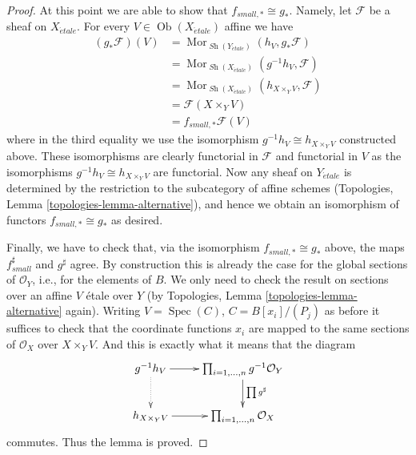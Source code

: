 \documentclass[10pt,a4paper]{amsart}
\theoremstyle{plain}
\theoremstyle{definition}
\theoremstyle{remark}
\numberwithin{equation}{subsection}
\def\Spec{\mathop{\mathrm{Spec}}}
\def\Mor{\mathop{\mathrm{Mor}}\nolimits}
\def\Ob{\mathop{\mathrm{Ob}}\nolimits}
\def\Sh{\mathop{\mathit{Sh}}\nolimits}
\def\etale{{\acute{e}tale}}
\begin{document}
\begin{proof}
\medskip\noindent
At this point we are able to show that $f_{small, *} \cong g_*$.
Namely, let $\mathcal{F}$ be a sheaf on $X_\etale$. For every
$V \in \Ob(X_\etale)$ affine we have
\begin{align*}
(g_*\mathcal{F})(V)
& =
\Mor_{\Sh(Y_\etale)}(h_V, g_*\mathcal{F}) \\
& =
\Mor_{\Sh(X_\etale)}(g^{-1}h_V, \mathcal{F}) \\
& =
\Mor_{\Sh(X_\etale)}(h_{X \times_Y V}, \mathcal{F}) \\
& =
\mathcal{F}(X \times_Y V) \\
& =
f_{small, *}\mathcal{F}(V)
\end{align*}
where in the third equality we use the isomorphism
$g^{-1}h_V \cong h_{X \times_Y V}$ constructed above. These isomorphisms
are clearly functorial in $\mathcal{F}$ and functorial in $V$
as the isomorphisms $g^{-1}h_V \cong h_{X \times_Y V}$ are functorial.
Now any sheaf on $Y_\etale$ is determined by the restriction
to the subcategory of affine schemes
(Topologies, Lemma \ref{topologies-lemma-alternative}),
and hence we obtain an isomorphism of functors $f_{small, *} \cong g_*$
as desired.

\medskip\noindent
Finally, we have to check that, via the isomorphism
$f_{small, *} \cong g_*$ above, the maps $f_{small}^\sharp$ and
$g^\sharp$ agree. By construction this is already the case for the
global sections of $\mathcal{O}_Y$, i.e., for the elements of $B$.
We only need to check the result on
sections over an affine $V$ \'etale over $Y$ (by
Topologies, Lemma \ref{topologies-lemma-alternative}
again). Writing
$V = \Spec(C)$, $C = B[x_i]/(P_j)$ as before it suffices
to check that the coordinate functions $x_i$ are mapped to
the same sections of $\mathcal{O}_X$ over $X \times_Y V$.
And this is exactly what it means that the diagram
$$
\xymatrix{
g^{-1}h_V \ar[r] \ar@{..>}[d] &
\prod\nolimits_{i = 1, \ldots, n} g^{-1}\mathcal{O}_Y
\ar[d]^{\prod g^\sharp} \\
h_{X \times_Y V} \ar[r] &
\prod\nolimits_{i = 1, \ldots, n} \mathcal{O}_X
}
$$
commutes. Thus the lemma is proved.
\end{proof}
\end{document}
